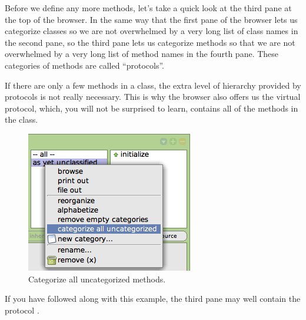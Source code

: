 \documentclass[a4paper,10pt,twoside]{book}
\begin{document}
Before we define any more methods, let's take a quick look at the third pane at the top of the browser.
In the same way that the first pane of the browser lets us categorize classes so we are not overwhelmed by a very long list of class names in the second pane, so the third pane lets us categorize methods so that we are not overwhelmed by a very long list of method names in the fourth pane.   
These categories of methods are called ``protocols''.

If there are only a few methods in a class, the extra level of hierarchy provided by protocols is not really necessary.
This is why the browser also offers us the  virtual protocol, which, you will not be surprised to learn, contains all of the methods in the class.

\begin{figure}[htbp]
   \centering
   \includegraphics[scale=0.7]{Categorize} 
   \caption{Categorize all uncategorized methods.\label{fig:categorize}}
\end{figure}

If you have followed along with this example, the third pane may well contain the protocol .
\end{document}
